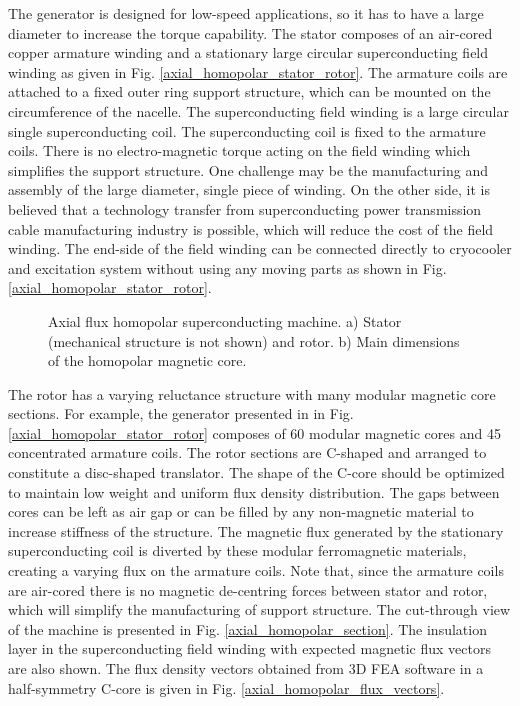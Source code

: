 \documentclass[final,peerreview,onecolumn]{IEEEtran}
\begin{document}
The generator is designed for low-speed applications, so it has to have a large diameter to increase the torque capability. The stator composes of an air-cored copper armature winding and a stationary large circular superconducting field winding as given in Fig. \ref{axial_homopolar_stator_rotor}. The armature coils are attached to a fixed outer ring support structure, which can be mounted on the circumference of the nacelle. The superconducting  field winding is a large circular single superconducting coil. The superconducting coil is fixed to the armature coils. There is no electro-magnetic torque acting on the field winding which simplifies the support structure. One challenge may be the manufacturing and assembly of the large diameter, single piece of winding. On the other side, it is believed that a technology transfer from superconducting power transmission cable manufacturing industry is possible, which will reduce the cost of the field winding. The end-side of the field winding can be connected directly to cryocooler and excitation system without using any moving parts as shown in Fig. \ref{axial_homopolar_stator_rotor}.


\begin{figure}[!h]
\centerline{
\hfil
{}
}
\caption{ Axial flux homopolar superconducting machine. a) Stator (mechanical structure is not shown) and rotor.
b) Main dimensions of the homopolar magnetic core.}
\end{figure}

The rotor has a varying reluctance structure with many modular magnetic core sections. For example, the generator presented in in Fig. \ref{axial_homopolar_stator_rotor} composes of 60 modular magnetic cores and 45 concentrated armature coils. The rotor sections are C-shaped and arranged to constitute a disc-shaped translator. The shape of the C-core should be optimized to maintain low weight and uniform flux density distribution. The gaps between cores can be left as air gap or can be filled by any non-magnetic material to increase stiffness of the structure. The magnetic flux generated by the stationary superconducting coil is diverted by these modular ferromagnetic materials, creating a varying flux on the armature coils. Note that, since the armature coils are air-cored there is no magnetic de-centring forces between stator and rotor, which will simplify the manufacturing of support structure. The cut-through view of the machine is presented in Fig. \ref{axial_homopolar_section}. The insulation layer in the superconducting field winding with expected magnetic flux vectors are also shown. The flux density vectors obtained from 3D FEA software in a half-symmetry C-core is given in Fig. \ref{axial_homopolar_flux_vectors}. 
\end{document}
